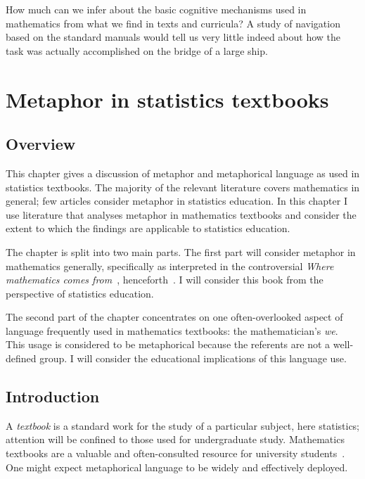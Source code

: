 \begin{singlespace}
\begin{savequote}[105mm]
  How much can we infer about the basic cognitive mechanisms used in
  mathematics from what we find in texts and curricula? A study of
  navigation based on the standard manuals would tell us very little
  indeed about how the task was actually accomplished on the bridge of
  a large ship.  
\end{savequote}
\end{singlespace}

\chapter{Metaphor in statistics textbooks}
\label{chapter5}

\section{Overview}

This chapter gives a discussion of metaphor and metaphorical language
as used in statistics textbooks.  The majority of the relevant
literature covers mathematics in general; few articles consider
metaphor in statistics education.  In this chapter I use literature
that analyses metaphor in mathematics textbooks and consider the
extent to which the findings are applicable to statistics education.

The chapter is split into two main parts.  The first part will
consider metaphor in mathematics generally, specifically as
interpreted in the controversial \emph{Where mathematics comes
  from}~\citep{lakoff2000}, henceforth~\wmcf.  I will consider this
book from the perspective of statistics education.

The second part of the chapter concentrates on one often-overlooked
aspect of language frequently used in mathematics textbooks: the
mathematician's \emph{we}.  This usage is considered to be
metaphorical because the referents are not a well-defined group.  I
will consider the educational implications of this language use.

\section{Introduction}

A \emph{textbook} is a standard work for the study of a particular
subject, here statistics; attention will be confined to those used for
undergraduate study.  Mathematics textbooks are a valuable and
often-consulted resource for university
students~\parencite{weinberg2012}.  One might expect metaphorical
language to be widely and effectively deployed.

